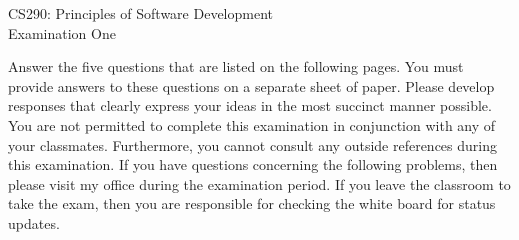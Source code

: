 \documentclass[12pt,epsf,psfig,graphics]{article}
\def\widow#1{\vskip #1\vbadness10000\penalty-200\vskip-#1}
\begin{document}

\def\widow#1{\vskip #1\vbadness10000\penalty-200\vskip-#1}

\begin{center}

CS290: Principles of Software Development \\
Examination One\\

\end{center}

\noindent
Answer the five questions that are listed on the following pages.  You must provide answers to these questions on a
separate sheet of paper.  Please develop responses that clearly express your ideas in the most succinct manner possible.
You are not permitted to complete this examination in conjunction with any of your classmates.  Furthermore, you cannot
consult any outside references during this examination.  If you have questions concerning the following problems, then
please visit my office during the examination period.  If you leave the classroom to take the exam, then you are
responsible for checking the white board for status updates.

\end{document}
